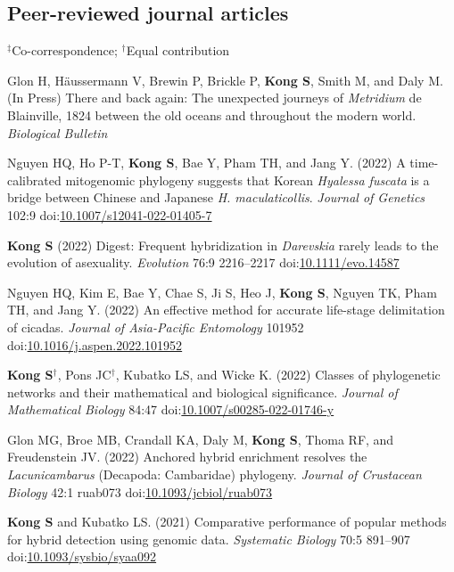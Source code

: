 \documentclass[11pt,letterpaper,sans]{moderncv} %
\begin{document}
\subsection{Peer-reviewed journal articles}
$^\ddag$Co-correspondence; $^\dag$Equal contribution
\begin{etaremune}
	\item Glon H, Häussermann V, Brewin P, Brickle P, \textbf{Kong S}, Smith M, and Daly M. (In Press) There and back again: The unexpected journeys of \textit{Metridium} de Blainville, 1824 between the old oceans and throughout the modern world. \textit{Biological Bulletin}
	
	\item Nguyen HQ, Ho P-T, \textbf{Kong S}, Bae Y, Pham TH, and Jang Y. (2022) A time-calibrated mitogenomic phylogeny suggests that Korean \textit{Hyalessa fuscata} is a bridge between Chinese and Japanese \textit{H. maculaticollis}. \textit{Journal of Genetics} 102:9 doi:\href{https://doi.org/10.1007/s12041-022-01405-7}{10.1007/s12041-022-01405-7}
	
	\item \textbf{Kong S} (2022) Digest: Frequent hybridization in \textit{Darevskia} rarely leads to the evolution of asexuality. \textit{Evolution} 76:9 2216--2217 doi:\href{https://doi.org/10.1111/evo.14587}{10.1111/evo.14587}
	
	\item Nguyen HQ, Kim E, Bae Y, Chae S, Ji S, Heo J, \textbf{Kong S}, Nguyen TK, Pham TH, and Jang Y. (2022) An effective method for accurate life-stage delimitation of cicadas. \textit{Journal of Asia-Pacific Entomology} 101952 doi:\href{https://doi.org/10.1016/j.aspen.2022.101952}{10.1016/j.aspen.2022.101952}
	
	\item \textbf{Kong S}$^\dag$, Pons JC$^\dag$, Kubatko LS, and Wicke K. (2022) Classes of phylogenetic networks and their mathematical and biological significance. \textit{Journal of Mathematical Biology} 84:47 doi:\href{https://doi.org/10.1007/s00285-022-01746-y}{10.1007/s00285-022-01746-y}
	
	\item Glon MG, Broe MB, Crandall KA, Daly M, \textbf{Kong S}, Thoma RF, and Freudenstein JV. (2022) Anchored hybrid enrichment resolves the \textit{Lacunicambarus} (Decapoda: Cambaridae) phylogeny. \textit{Journal of Crustacean Biology} 42:1 ruab073 doi:\href{https://doi.org/10.1093/jcbiol/ruab073}{10.1093/jcbiol/ruab073}
	
	\item \textbf{Kong S} and Kubatko LS. (2021) Comparative performance of popular methods for hybrid detection using genomic data. \textit {Systematic Biology} 70:5 891–907 doi:\href{https://doi.org/10.1093/sysbio/syaa092}{10.1093/sysbio/syaa092}
	

\end{etaremune}
\end{document}
